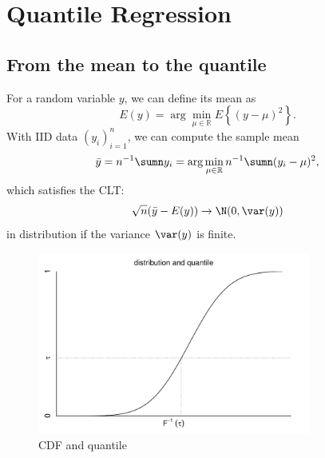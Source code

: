 
\chapter{Quantile Regression}\label{chapter::quantile-regression}
 

\section{From the mean to the quantile}

For a random variable $y$, we can define its mean as 
\[
E(y)=\arg\min_{\mu  \in \mathbb{R} }E\left\{ (y-\mu)^{2}\right\} .
\]
With IID data $(y_{i})_{i=1}^{n}$, we can compute the sample mean
\[
\bar{y}=n^{-1}\sumn y_{i} = \arg\min_{\mu \in \mathbb{R} } n^{-1} \sumn (y_i-\mu)^{2} ,
\]
which satisfies the CLT: 
\[
\sqrt{n}(\bar{y}-E(y))\rightarrow\N(0, \var(y))
\]
in distribution if the variance $ \var(y)$ is finite. 


\begin{figure}[ht]
\centering
\includegraphics[width=0.8\textwidth]{figures/CDFquantile.pdf}
\caption{CDF and quantile}\label{fig::cdf-quantile}
\end{figure}


